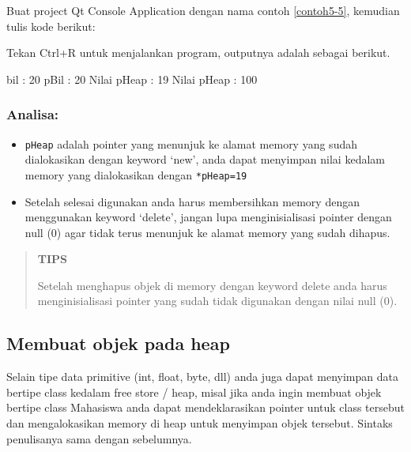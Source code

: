 Buat project Qt Console Application dengan nama contoh \ref{contoh5-5}, kemudian tulis
kode berikut:



Tekan Ctrl+R untuk menjalankan program, outputnya adalah sebagai
berikut.

\begin{lcverbatim}
bil : 20
pBil : 20
Nilai pHeap : 19
Nilai pHeap : 100
\end{lcverbatim}

\subsubsection*{Analisa:}

\begin{itemize}

\item
 \texttt{pHeap} adalah pointer yang menunjuk ke alamat memory yang
 sudah dialokasikan dengan keyword `new', anda dapat menyimpan nilai
 kedalam memory yang dialokasikan dengan \texttt{*pHeap=19}
\item
 Setelah selesai digunakan anda harus membersihkan memory dengan
 menggunakan keyword `delete', jangan lupa menginisialisasi pointer
 dengan null (0) agar tidak terus menunjuk ke alamat memory yang sudah
 dihapus.
\end{itemize}



 \begin{quotation}
 {\LARGE {}} \textbf{TIPS}

 Setelah menghapus objek di memory dengan keyword delete anda harus
 menginisialisasi pointer yang sudah tidak digunakan dengan nilai null
 (0).
 \end{quotation}

\subsection{Membuat objek pada heap}\label{membuat-objek-pada-heap}

Selain tipe data primitive (int, float, byte, dll) anda juga dapat
menyimpan data bertipe class kedalam free store / heap, misal jika anda
ingin membuat objek bertipe class Mahasiswa anda dapat mendeklarasikan
pointer untuk class tersebut dan mengalokasikan memory di heap untuk
menyimpan objek tersebut. Sintaks penulisanya sama dengan sebelumnya.

